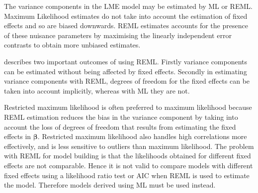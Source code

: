 \documentclass[12pt, a4paper]{report}
\theoremstyle{plain}
\theoremstyle{definition}
\theoremstyle{remark}
\begin{document}
			The variance components in the LME model may be estimated by ML or REML. Maximum Likelihood estimates do not take into account the estimation of fixed effects and so
			are biased downwards. REML estimates accounts for the presence of these nuisance parameters by maximising the linearly independent error contrasts to obtain more unbiased estimates.
			

		
		
		
	
	
	\citet{McCullSearle} describes two important outcomes of using
	REML. Firstly variance components can be estimated without being
	affected by fixed effects. Secondly in estimating variance
	components with REML, degrees of freedom for the fixed effects can
	be taken into account implicitly, whereas with ML they are not.
	
	Restricted maximum likelihood is often preferred to maximum likelihood because REML estimation reduces the bias in the variance component by taking into account the loss of degrees of freedom that results
	from estimating the fixed effects in $\boldsymbol{\beta}$. Restricted maximum likelihood also handles high correlations more effectively, and is less sensitive to outliers than maximum likelihood.  The problem with REML for model building is that the likelihoods obtained for different fixed effects are not comparable. Hence it is not valid to compare models with different fixed effects using a likelihood ratio test or AIC when REML is used to
	estimate the model. Therefore models derived using ML must be used instead.

	
%	
%	
%	
%	
	
\end{document}
